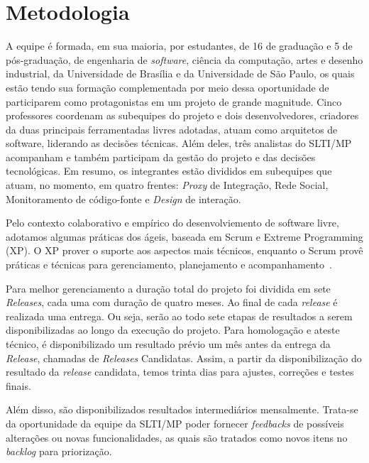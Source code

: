\section{Metodologia}
\label{sec:metodologia}

A equipe é formada, em sua maioria, por estudantes, de 16 de graduação e 5 de
pós-graduação, de engenharia de \textit{software}, ciência da computação, artes
e desenho industrial, da Universidade de Brasília e da Universidade de São
Paulo, os quais estão tendo sua formação complementada por meio dessa
oportunidade de participarem como protagonistas em um projeto de grande
magnitude.
%
Cinco professores coordenam as subequipes do projeto e dois desenvolvedores,
criadores da duas principais ferramentadas livres adotadas, atuam como
arquitetos de software, liderando as decisões técnicas.
%
Além deles, três analistas do SLTI/MP acompanham e também participam da gestão
do projeto e das decisões tecnológicas.
%
Em resumo, os integrantes estão divididos em subequipes que atuam, no momento,
em quatro frentes: \emph{Proxy} de Integração, Rede Social, Monitoramento de
código-fonte e \textit{Design} de interação.


Pelo contexto colaborativo e empírico do desenvolviemento de software livre,
adotamos algumas práticas dos ágeis, baseada em Scrum e Extreme Programming (XP).
%
O XP prover o suporte aos aspectos mais técnicos, enquanto o Scrum provê
práticas e técnicas para gerenciamento, planejamento e
acompanhamento~\cite{schwaber2001,fitzgerald2006}. 



Para melhor gerenciamento a duração total do projeto foi dividida em sete \textit{Releases}, cada uma com duração de quatro meses. Ao final de cada \textit{release} é realizada uma entrega. Ou seja, serão ao todo sete etapas de resultados a serem disponibilizadas ao longo da execução do projeto.
Para homologação e ateste técnico, é disponibilizado um resultado prévio um mês antes da entrega da \textit{Release}, chamadas de \textit{Releases} Candidatas. Assim, a partir da disponibilização do resultado da \textit{release} candidata, temos trinta dias para ajustes, correções e testes finais. 

Além disso, são disponibilizados resultados intermediários mensalmente. Trata-se da oportunidade da equipe da SLTI/MP poder fornecer \textit{feedbacks} de possíveis alterações ou novas funcionalidades, as quais são tratados como novos itens no \textit{backlog} para priorização.


